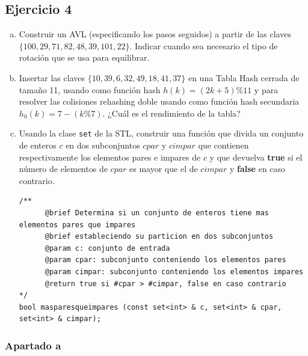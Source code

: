 \documentclass[10pt,a4paper,spanish]{report}
\begin{document}
\subsection{\textcolor[rgb]{0.5,0.8,1}Ejercicio 4}
\begin{enumerate}[a)]
      \item Construir un AVL (especificando los pasos seguidos) a partir de las claves $\{100,29,71,82,48,39,101,22\}$. Indicar cuando sea necesario el tipo de rotación que se usa para equilibrar.
      \item Insertar las claves $\{10,39,6,32,49,18,41,37\}$ en una Tabla Hash cerrada de tamaño 11, usando como función hash $h(k) = (2k + 5) \% 11$ y para resolver las colisiones rehashing doble usando como función hash secundaria $h_0 (k) = 7 - (k \% 7)$. ¿Cuál es el rendimiento de la tabla?
      \item Usando la clase \verb*|set| de la STL, construir una función que divida un conjunto de enteros $c$ en dos subconjuntos $cpar$ y $cimpar$ que contienen respectivamente los elementos pares e impares de $c$ y que devuelva \textbf{true} si el número de elementos de $cpar$ es mayor que el de $cimpar$ y \textbf{false} en caso contrario.
\begin{verbatim}
/**
      @brief Determina si un conjunto de enteros tiene mas elementos pares que impares
      @brief estableciendo su particion en dos subconjuntos
      @param c: conjunto de entrada
      @param cpar: subconjunto conteniendo los elementos pares
      @param cimpar: subconjunto conteniendo los elementos impares
      @return true si #cpar > #cimpar, false en caso contrario
*/
bool masparesqueimpares (const set<int> & c, set<int> & cpar, set<int> & cimpar);
\end{verbatim}
\end{enumerate}

\subsubsection{\textcolor[rgb]{0.5,0.8,1}Apartado a}
\label{avl_feb2013}
\end{document}

